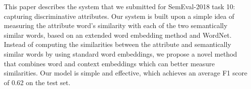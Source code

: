 This paper describes the system that we submitted for SemEval-2018 task 10: capturing discriminative attributes. Our system is built upon a simple idea of measuring the attribute word's similarity with each of the two semantically similar words, based on an extended word embedding method and WordNet. Instead of computing the similarities between the attribute and semantically similar words by using standard word embeddings, we propose a novel method that combines word and context embeddings which can better measure similarities. Our model is simple and effective, which achieves an average F1 score of 0.62 on the test set.
